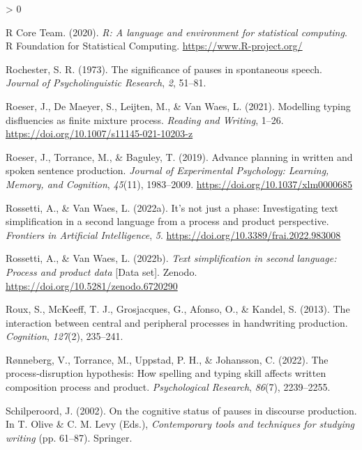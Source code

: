 \documentclass[
  english,
  man,floatsintext]{apa7}
\newlength{\cslhangindent}
\newenvironment{CSLReferences}[2] %
 {%
  \setlength{\parindent}{0pt}
  \ifodd #1 \everypar{\setlength{\hangindent}{\cslhangindent}}\ignorespaces\fi
  \ifnum #2 > 0
  \setlength{\parskip}{#2\baselineskip}
  \fi
 }%
 {}
\begin{document}
\begin{CSLReferences}{1}{0}
\leavevmode\hypertarget{ref-R-base}{}%
R Core Team. (2020). \emph{R: A language and environment for statistical computing}. R Foundation for Statistical Computing. \url{https://www.R-project.org/}

\leavevmode\hypertarget{ref-rochester1973significance}{}%
Rochester, S. R. (1973). The significance of pauses in spontaneous speech. \emph{Journal of Psycholinguistic Research}, \emph{2}, 51--81.

\leavevmode\hypertarget{ref-roeser2021modelling}{}%
Roeser, J., De Maeyer, S., Leijten, M., \& Van Waes, L. (2021). Modelling typing disfluencies as finite mixture process. \emph{Reading and Writing}, 1--26. \url{https://doi.org/10.1007/s11145-021-10203-z}

\leavevmode\hypertarget{ref-roeser2018advance}{}%
Roeser, J., Torrance, M., \& Baguley, T. (2019). Advance planning in written and spoken sentence production. \emph{Journal of Experimental Psychology: Learning, Memory, and Cognition}, \emph{45}(11), 1983--2009. \url{https://doi.org/10.1037/xlm0000685}

\leavevmode\hypertarget{ref-rossetti2022s}{}%
Rossetti, A., \& Van Waes, L. (2022a). It's not just a phase: Investigating text simplification in a second language from a process and product perspective. \emph{Frontiers in Artificial Intelligence}, \emph{5}. \url{https://doi.org/10.3389/frai.2022.983008}

\leavevmode\hypertarget{ref-rossetti2022text}{}%
Rossetti, A., \& Van Waes, L. (2022b). \emph{Text simplification in second language: Process and product data} {[}Data set{]}. Zenodo. \url{https://doi.org/10.5281/zenodo.6720290}

\leavevmode\hypertarget{ref-roux2013interaction}{}%
Roux, S., McKeeff, T. J., Grosjacques, G., Afonso, O., \& Kandel, S. (2013). The interaction between central and peripheral processes in handwriting production. \emph{Cognition}, \emph{127}(2), 235--241.

\leavevmode\hypertarget{ref-ronneberg2022process}{}%
Rønneberg, V., Torrance, M., Uppstad, P. H., \& Johansson, C. (2022). The process-disruption hypothesis: How spelling and typing skill affects written composition process and product. \emph{Psychological Research}, \emph{86}(7), 2239--2255.

\leavevmode\hypertarget{ref-schilperoord2002cognitive}{}%
Schilperoord, J. (2002). On the cognitive status of pauses in discourse production. In T. Olive \& C. M. Levy (Eds.), \emph{Contemporary tools and techniques for studying writing} (pp. 61--87). Springer.


\end{CSLReferences}
\end{document}
